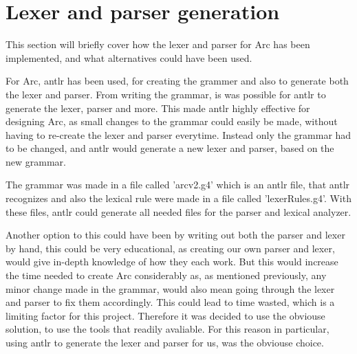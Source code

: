\section{Lexer and parser generation}

This section will briefly cover how the lexer and parser for Arc has been implemented, and what alternatives could have been used.

For Arc, \gls{antlr} has been used, for creating the grammer and also to generate both the lexer and parser. From writing the grammar, is was possible for \gls{antlr} to generate the lexer, parser and more.\cite{Parr2014} This made \gls{antlr} highly effective for designing Arc, as small changes to the grammar could easily be made, without having to re-create the lexer and parser everytime. Instead only the grammar had to be changed, and \gls{antlr} would generate a new lexer and parser, based on the new grammar.

The grammar was made in a file called 'arcv2.g4' which is an \gls{antlr} file, that \gls{antlr} recognizes and also the lexical rule were made in a file called 'lexerRules.g4'. With these files, \gls{antlr} could generate all needed files for the parser and lexical analyzer.



Another option to this could have been by writing out both the parser and lexer by hand, this could be very educational, as creating our own parser and lexer, would give in-depth knowledge of how they each work. But this would increase the time needed to create Arc considerably as, as mentioned previously, any minor change made in the grammar, would also mean going through the lexer and parser to fix them accordingly. This could lead to time wasted, which is a limiting factor for this project. Therefore it was decided to use the obviouse solution, to use the tools that readily avaliable. For this reason in particular, using \gls{antlr} to generate the lexer and parser for us, was the obviouse choice. 






